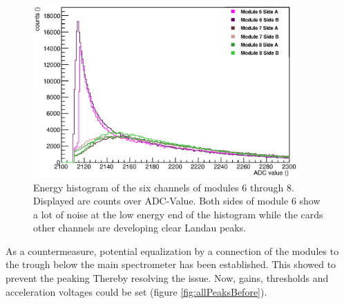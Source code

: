   \begin{figure}
   \centering
   \includegraphics[width=0.9\textwidth]{graphics/setup/histogramNoise.eps}
   \caption[Six channel energy histogram with noise]{Energy histogram of the six channels of modules 6 through 8. Displayed are counts over ADC-Value. Both sides of module 6 show a lot of noise at the low energy end of the histogram while the cards other channels are developing clear Landau peaks.}
   \label{fig:histogramNoise}
  \end{figure}
  
  As a countermeasure, potential equalization by a connection of the modules to the trough below the main spectrometer has been established. This showed to prevent the peaking Thereby resolving the issue. Now, gains, thresholds and acceleration voltages could be set (figure \ref{fig:allPeaksBefore}).
  
